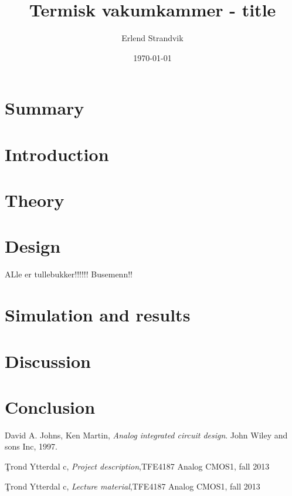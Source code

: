 \documentclass[12pt, a4paper, english]{article}
\title{Termisk vakumkammer - title}
\date{\today}
\author{Erlend Strandvik}
\numberwithin{equation}{section}
\numberwithin{figure}{section}
\numberwithin{table}{section}
\begin{document}




\section*{Summary}
%
\paragraph{}
\newpage

\tableofcontents
\listoffigures
\newpage
\setcounter{page}{1}

\section{Introduction}
%
\newpage


\section{Theory}
%



\newpage

\section{Design}
%

ALle er tullebukker!!!!!! Busemenn!!


\newpage

\section{Simulation and results}
%

\newpage

\section{Discussion}
%
\newpage

\section{Conclusion}
%
\newpage

\begin{thebibliography}{9}

 \label{boka}
  David A. Johns, Ken Martin,
  \emph{Analog integrated circuit design}.
  John Wiley and sons Inc,  
  1997.

 \label{description}
	\c Trond Ytterdal c, \emph{Project description},TFE4187 Analog CMOS1, fall 2013

 \label{foiler}
	\c Trond Ytterdal c, \emph{Lecture material},TFE4187 Analog CMOS1, fall 2013


\end{thebibliography}
\clearpage{}



\begin{appendix}

\newpage


\end{appendix}
\end{document}
